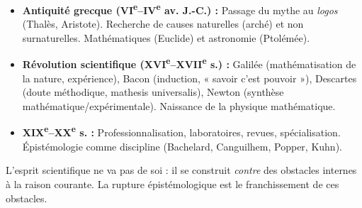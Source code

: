 \documentclass[11pt]{article}
\newcommand{\cle}[1]{{\popxbold\color{popdark}#1}}
\begin{document}
\begin{savaistu}
\begin{itemize}
\item \textbf{Antiquité grecque (VI\textsuperscript{e}--IV\textsuperscript{e} av. J.-C.) :} Passage du mythe au \emph{logos} (Thalès, Aristote). Recherche de causes naturelles (arché) et non surnaturelles. Mathématiques (Euclide) et astronomie (Ptolémée).
\item \textbf{Révolution scientifique (XVI\textsuperscript{e}--XVII\textsuperscript{e} s.) :} Galilée (mathématisation de la nature, expérience), Bacon (induction, « savoir c'est pouvoir »), Descartes (doute méthodique, mathesis universalis), Newton (synthèse mathématique/expérimentale). Naissance de la \cle{physique mathématique}.
\item \textbf{XIX\textsuperscript{e}--XX\textsuperscript{e} s. :} Professionnalisation, laboratoires, revues, spécialisation. Épistémologie comme discipline (Bachelard, Canguilhem, Popper, Kuhn).
\end{itemize}
\end{savaistu}

\begin{definition}
L'esprit scientifique ne va pas de soi : il se construit \emph{contre} des obstacles internes à la raison courante. La \cle{rupture épistémologique} est le franchissement de ces obstacles.
\end{definition}
\end{document}
